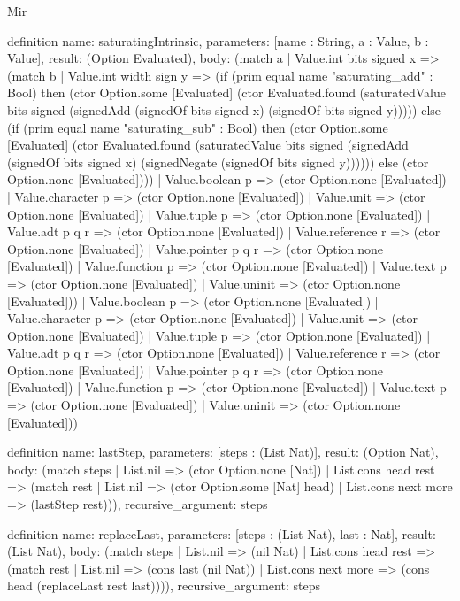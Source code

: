 \begin{lexlean}{Mir}
\begin{semanticmodule}
definition{
  name: saturatingIntrinsic,
  parameters: [name : String, a : Value, b : Value],
  result: (Option Evaluated),
  body: (match a
    | Value.int bits signed x => (match b
      | Value.int width sign y => (if (prim equal name "saturating_add" : Bool) then (ctor Option.some [Evaluated] (ctor Evaluated.found (saturatedValue bits signed (signedAdd (signedOf bits signed x) (signedOf bits signed y))))) else (if (prim equal name "saturating_sub" : Bool) then (ctor Option.some [Evaluated] (ctor Evaluated.found (saturatedValue bits signed (signedAdd (signedOf bits signed x) (signedNegate (signedOf bits signed y)))))) else (ctor Option.none [Evaluated])))
      | Value.boolean p => (ctor Option.none [Evaluated])
      | Value.character p => (ctor Option.none [Evaluated])
      | Value.unit => (ctor Option.none [Evaluated])
      | Value.tuple p => (ctor Option.none [Evaluated])
      | Value.adt p q r => (ctor Option.none [Evaluated])
      | Value.reference r => (ctor Option.none [Evaluated])
      | Value.pointer p q r => (ctor Option.none [Evaluated])
      | Value.function p => (ctor Option.none [Evaluated])
      | Value.text p => (ctor Option.none [Evaluated])
      | Value.uninit => (ctor Option.none [Evaluated]))
    | Value.boolean p => (ctor Option.none [Evaluated])
    | Value.character p => (ctor Option.none [Evaluated])
    | Value.unit => (ctor Option.none [Evaluated])
    | Value.tuple p => (ctor Option.none [Evaluated])
    | Value.adt p q r => (ctor Option.none [Evaluated])
    | Value.reference r => (ctor Option.none [Evaluated])
    | Value.pointer p q r => (ctor Option.none [Evaluated])
    | Value.function p => (ctor Option.none [Evaluated])
    | Value.text p => (ctor Option.none [Evaluated])
    | Value.uninit => (ctor Option.none [Evaluated]))
}

definition{
  name: lastStep,
  parameters: [steps : (List Nat)],
  result: (Option Nat),
  body: (match steps
    | List.nil => (ctor Option.none [Nat])
    | List.cons head rest => (match rest
      | List.nil => (ctor Option.some [Nat] head)
      | List.cons next more => (lastStep rest))),
  recursive_argument: steps
}

definition{
  name: replaceLast,
  parameters: [steps : (List Nat), last : Nat],
  result: (List Nat),
  body: (match steps
    | List.nil => (nil Nat)
    | List.cons head rest => (match rest
      | List.nil => (cons last (nil Nat))
      | List.cons next more => (cons head (replaceLast rest last)))),
  recursive_argument: steps
}


\end{semanticmodule}
\end{lexlean}
